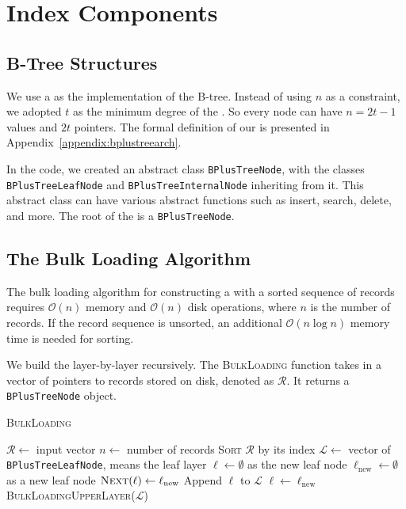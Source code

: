 \section{Index Components}
\label{sec:index}

\subsection{B-Tree Structures}

We use a \bplustree as the implementation of the B-tree. Instead of using $n$ as a constraint, we adopted $t$ as the minimum degree of the \bplustree. So every node can have $n=2t - 1$ values and $2t$ pointers. The formal definition of our \bplustree is presented in Appendix~\ref{appendix:bplustreearch}.

In the code, we created an abstract class \texttt{BPlusTreeNode}, with the classes \texttt{BPlusTreeLeafNode} and \texttt{BPlusTreeInternalNode} inheriting from it. This abstract class can have various abstract functions such as insert, search, delete, and more. The root of the \bplustree is a \texttt{BPlusTreeNode}.

\subsection{The Bulk Loading Algorithm}

The bulk loading algorithm for constructing a \bplustree with a sorted sequence of records requires $\mathcal{O}(n)$ memory and $\mathcal{O}(n)$ disk operations, where $n$ is the number of records. If the record sequence is unsorted, an additional $\mathcal{O}(n\log n)$ memory time is needed for sorting.

We build the \bplustree layer-by-layer recursively. The \textsc{BulkLoading} function takes in a vector of pointers to records stored on disk, denoted as $\mathcal{R}$. It returns a \texttt{BPlusTreeNode} object.

\begin{algorithm}
	\caption{\textsc{BulkLoading}}
	\begin{algorithmic}
        \State $\mathcal{R} \leftarrow $ input vector
        \State $n\leftarrow$ number of records
        \State \textsc{Sort} $\mathcal{R}$ by its index
        \State $\mathcal{L} \leftarrow $ vector of \texttt{BPlusTreeLeafNode}, means the leaf layer
        \State $\ell \leftarrow\emptyset$ as the new leaf node
            \State $\ell_{\mathrm{new}}\leftarrow\emptyset$ as a new leaf node
            \State $\textsc{Next}(\ell)\leftarrow\ell_{\mathrm{new}}$
            \State Append $\ell$ to $\mathcal{L}$
            \State $\ell\leftarrow\ell_{\mathrm{new}}$
        \EndIf
        \EndFor
        \State \Return \textsc{BulkLoadingUpperLayer($\mathcal{L}$)}
	\end{algorithmic} 
\end{algorithm}

